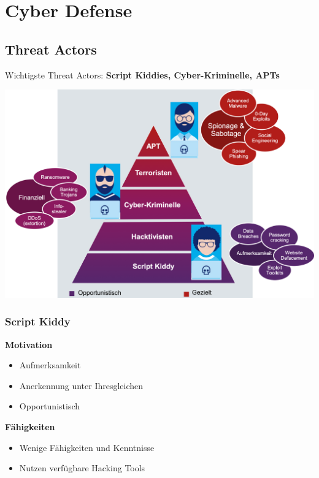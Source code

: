 

\section{Cyber Defense}\label{sec:cyber-defense}

\subsection{Threat Actors}\label{subsec:threat-actors}
Wichtigste Threat Actors: \textbf{Script Kiddies, Cyber-Kriminelle, APTs}
\begin{center}
    \vspace{-8pt}
    \includegraphics[width=.8\linewidth]{./img/01-cyber_defense/threat_actors}
    \vspace{-8pt}
\end{center}


\subsubsection{Script Kiddy}
\vspace{-8pt}
\begin{multicols*}{2}
    \textbf{Motivation}
    \begin{itemize}
        \item Aufmerksamkeit
        \item Anerkennung unter Ihresgleichen
        \item Opportunistisch
    \end{itemize}
    \columnbreak
    \textbf{Fähigkeiten}
    \begin{itemize}
        \item Wenige Fähigkeiten und Kenntnisse
        \item Nutzen verfügbare Hacking Tools
    \end{itemize}
\end{multicols*}
\vspace{-8pt}


